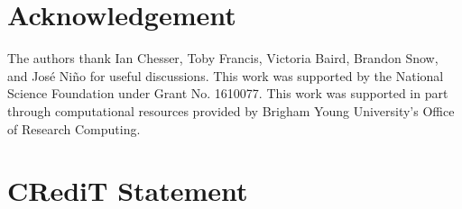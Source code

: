 \documentclass[final,twocolumn,12pt]{elsarticle}
\begin{document}
\section*{Acknowledgement} %

The authors thank Ian Chesser, Toby Francis, Victoria Baird, Brandon Snow, and José Niño for useful discussions. This work was supported by the National Science Foundation under Grant No. 1610077. This work was supported in part through computational resources provided by Brigham Young University's Office of Research Computing.

\section*{CRediT Statement}


% 
\end{document}
